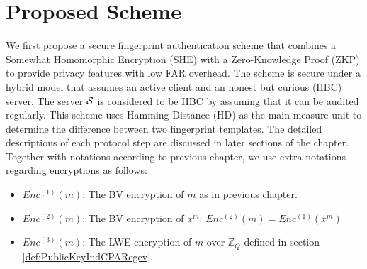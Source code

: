 \section{Proposed Scheme}
We first propose a secure fingerprint authentication scheme that combines a
Somewhat Homomorphic Encryption (SHE) with a Zero-Knowledge Proof (ZKP) to
provide privacy features with low FAR overhead. The scheme is secure under a
hybrid model that assumes an active client and an honest but curious (HBC)
server. The server $\mathcal{S}$ is considered to be HBC by assuming that it can be
audited regularly. This scheme uses Hamming Distance (HD) as the main measure
unit to determine the difference between two fingerprint templates. The detailed
descriptions of each protocol step are discussed in later sections of the
chapter. Together with notations according to previous chapter, we use extra notations regarding encryptions as follows:
\begin{itemize}
\item $Enc^{(1)}(m)$: The BV encryption of $m$ as in previous chapter.
\item $Enc^{(2)}(m)$: The BV encryption of $x^{m}$: $Enc^{(2)}(m) = Enc^{(1)}(x^{m})$
\item $Enc^{(3)}(m)$: The LWE encryption of $m$ over $\mathbb{Z}_{Q}$ defined in section \ref{def:PublicKeyIndCPARegev}.
\end{itemize}


